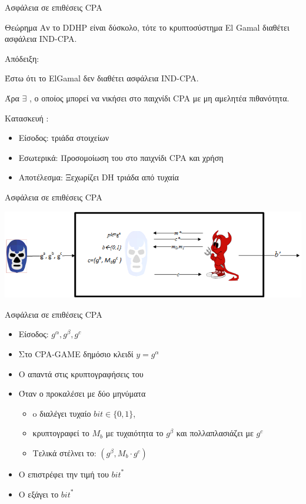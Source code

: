\documentclass[handout]{beamer}
\begin{document}
\begin{frame}{Ασφάλεια σε επιθέσεις CPA}
\begin{block}{Θεώρημα}
Αν το DDHP είναι δύσκολο, τότε το κρυπτοσύστημα El Gamal διαθέτει ασφάλεια IND-CPA.
\end{block}

Απόδειξη:

Έστω ότι το ElGamal δεν διαθέτει ασφάλεια IND-CPA. 

Άρα $\exists$ \adv, ο οποίος μπορεί να νικήσει στο παιχνίδι CPA με μη αμελητέα πιθανότητα. 

Κατασκευή \advb:
\begin{itemize}
\item Είσοδος: τριάδα στοιχείων
\item Εσωτερικά: Προσομοίωση του \chal στο παιχνίδι CPA και χρήση \adv 
\item Αποτέλεσμα: Ξεχωρίζει DH τριάδα από τυχαία 
\end{itemize}
\end{frame}

\begin{frame}{Ασφάλεια σε επιθέσεις CPA}
	\begin{center}
	\includegraphics[scale=.6]{egcpa.png}
	\end{center}
	\end{frame}

\begin{frame}{Ασφάλεια σε επιθέσεις CPA}
\begin{itemize}
\item Είσοδος: $g^\alpha,g^\beta, g^c$
\item Στο CPA-GAME δημόσιο κλειδί $y =  g^\alpha$ 
\item Ο \advb απαντά στις κρυπτογραφήσεις του \adv
\item Όταν ο \adv προκαλέσει με δύο μηνύματα 
\begin{itemize}
\item o \chal διαλέγει τυχαίο $bit \in \{0, 1\}$,
\item κρυπτογραφεί το $M_b$ με τυχαιότητα το $g^\beta$ και πολλαπλασιάζει με $g^{c}$
\item Τελικά στέλνει το:  $( g^\beta  , M_b \cdot g^{c}  )$
\end{itemize}
\item O \adv επιστρέφει την τιμή του ${bit}^*$
\item Ο \advb εξάγει το ${bit}^*$
\end{itemize}


\end{frame}
\end{document}
